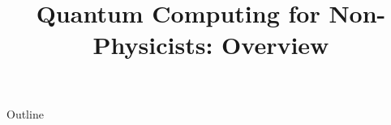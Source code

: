 \documentclass[xcolor=dvipsnames,compress,t,pdf,9pt]{beamer}
\title[\insertframenumber /\inserttotalframenumber]{Quantum Computing for Non-Physicists: Overview}
\begin{document}
	\begin{frame}
	\titlepage
	\end{frame}

	\begin{frame}{Outline}
	    \tableofcontents
	\end{frame}

	
	
	
	
\end{document}
